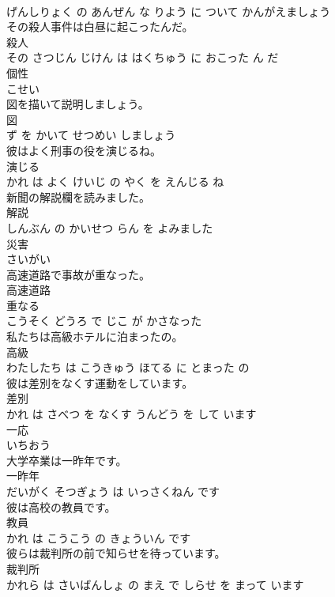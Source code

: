 \documentclass[8pt]{extreport}
\begin{document}
\begin{CJK}{UTF8}{min}
\\	げんしりょく の あんぜん な りよう に ついて かんがえましょう			
\\	その殺人事件は白昼に起こったんだ。	
\\	殺人 
\\	その さつじん じけん は はくちゅう に おこった ん だ			
\\	個性	
\\	こせい		
\\	図を描いて説明しましょう。	
\\	図 
\\	ず を かいて せつめい しましょう			
\\	彼はよく刑事の役を演じるね。	
\\	演じる 
\\	かれ は よく けいじ の やく を えんじる ね			
\\	新聞の解説欄を読みました。	
\\	解説 
\\	しんぶん の かいせつ らん を よみました			
\\	災害	
\\	さいがい		
\\	高速道路で事故が重なった。	
\\	高速道路 
\\	重なる 
\\	こうそく どうろ で じこ が かさなった			
\\	私たちは高級ホテルに泊まったの。	
\\	高級 
\\	わたしたち は こうきゅう ほてる に とまった の			
\\	彼は差別をなくす運動をしています。	
\\	差別 
\\	かれ は さべつ を なくす うんどう を して います			
\\	一応	
\\	いちおう		
\\	大学卒業は一昨年です。	
\\	一昨年 
\\	だいがく そつぎょう は いっさくねん です			
\\	彼は高校の教員です。	
\\	教員 
\\	かれ は こうこう の きょういん です			
\\	彼らは裁判所の前で知らせを待っています。	
\\	裁判所 
\\	かれら は さいばんしょ の まえ で しらせ を まって います			

\end{CJK}
\end{document}
